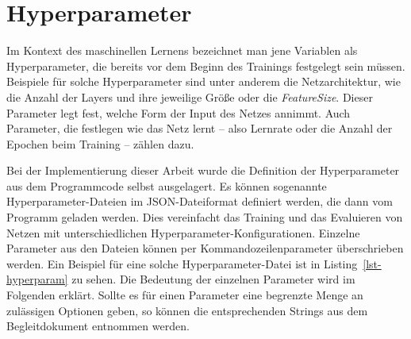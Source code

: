   

\section{Hyperparameter}


Im Kontext des maschinellen Lernens bezeichnet man jene Variablen als Hyperparameter, 
die bereits vor dem Beginn des Trainings festgelegt sein müssen.
Beispiele für solche Hyperparameter sind unter anderem die Netzarchitektur, wie die Anzahl der Layers und ihre jeweilige Größe 
oder die \textit{FeatureSize}.
Dieser Parameter legt fest, welche Form der Input des Netzes annimmt.
Auch Parameter, die festlegen wie das Netz lernt -- also Lernrate oder die Anzahl der Epochen beim Training -- zählen dazu.

Bei der Implementierung dieser Arbeit wurde die Definition der Hyperparameter aus dem Programmcode selbst ausgelagert.
Es können sogenannte Hyperparameter-Dateien im JSON-Dateiformat definiert werden, die dann vom Programm geladen werden.
Dies vereinfacht das Training und das Evaluieren von Netzen mit unterschiedlichen Hyperparameter-Konfigurationen.
Einzelne Parameter aus den Dateien können per Kommandozeilenparameter überschrieben werden.
Ein Beispiel für eine solche Hyperparameter-Datei ist in Listing~\ref{lst-hyperparam} zu sehen.
Die Bedeutung der einzelnen Parameter wird im Folgenden erklärt. 
Sollte es für einen Parameter eine begrenzte Menge an zulässigen Optionen geben, 
so können die entsprechenden Strings aus dem Begleitdokument entnommen werden.


\newpage

